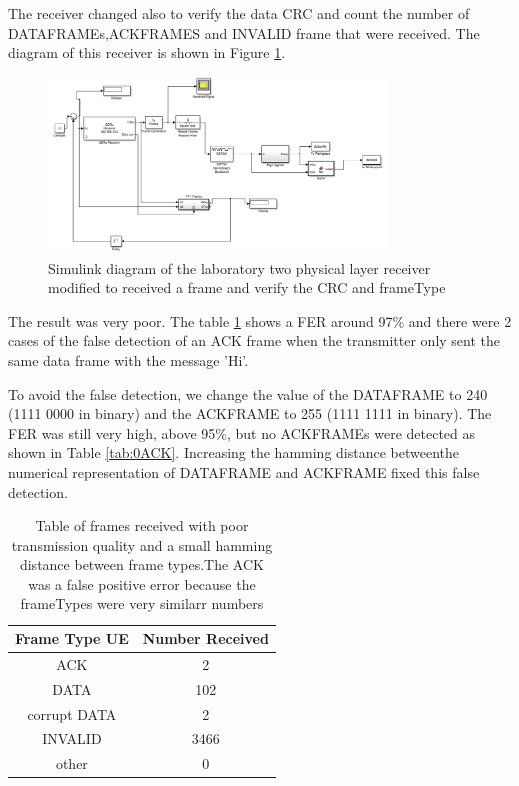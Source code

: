 The receiver changed also to verify the data CRC and count the number of DATAFRAMEs,ACKFRAMES and INVALID frame that were received. The diagram of this receiver is
shown in Figure \ref{fig:receiver_lab02}.

\begin{figure}[ht]
    \centering
    \includegraphics[width=0.8\textwidth]{receiver_lab02.PNG}
    \caption{Simulink diagram of the laboratory two physical layer receiver modified to received a frame and verify the CRC and frameType }
    \label{fig:receiver_lab02}
\end{figure}


The result was very poor. The table \ref{tab:2ACK} shows a FER around 97\% and there were 2 cases of the false detection of an ACK frame when the transmitter only sent
the same data frame with the message 'Hi'.  


To avoid the false detection, we change the value of the DATAFRAME to 240 (1111 0000 in binary) and the ACKFRAME to 255 (1111 1111 in binary).
The FER was still very high, above 95\%, but no ACKFRAMEs were detected as shown in Table \ref{tab:0ACK}. Increasing the hamming distance betweenthe numerical representation of DATAFRAME and ACKFRAME
fixed this false detection.
 
\begin{table}[ht]
	\centering
		\begin{tabular}{| c | c | }
		\hline                       
		Frame Type UE & Number Received\\
		\hline
			ACK & 2\\
			DATA & 102\\
			corrupt DATA & 2\\
			INVALID & 3466\\
			other & 0\\
		\hline
		\end{tabular}
	\caption{Table of frames received with poor transmission quality and a small hamming distance between frame types.The ACK was a false positive error because the frameTypes were very similarr numbers}
	\label{tab:2ACK}
\end{table}

